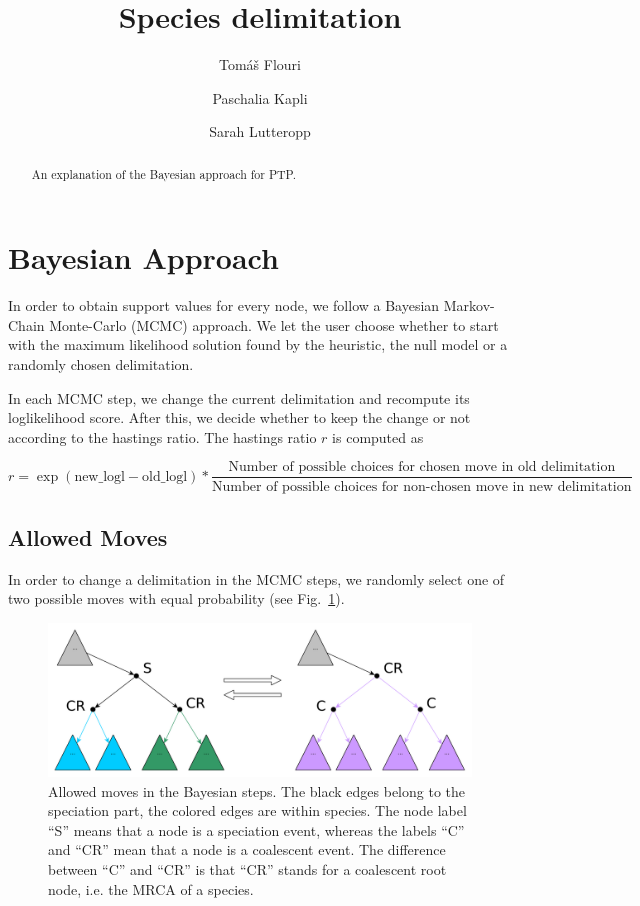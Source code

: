 \documentclass{llncs}
\begin{document}
\title{Species delimitation}


\author{Tom\'{a}\v{s} Flouri \and Paschalia Kapli \and Sarah Lutteropp}

\maketitle

\begin{abstract}
An explanation of the Bayesian approach for PTP.\@
\end{abstract}

\section{Bayesian Approach}

In order to obtain support values for every node, we follow a Bayesian Markov-Chain Monte-Carlo (MCMC) approach. We let the user choose whether to start with the maximum likelihood solution found by the heuristic, the null model or a randomly chosen delimitation.

In each MCMC step, we change the current delimitation and recompute its loglikelihood score. After this, we decide whether to keep the change or not according to the hastings ratio. The hastings ratio $r$ is computed as

$$r = \exp(\text{new\_logl} - \text{old\_logl}) * \frac{\text{Number of possible choices for chosen move in old delimitation}}{\text{Number of possible choices for non-chosen move in new delimitation}}$$

\subsection{Allowed Moves}

In order to change a delimitation in the MCMC steps, we randomly select one of two possible moves with equal probability (see Fig.~\ref{fig:moves}).

\begin{figure}[h!]
\centering
\includegraphics[scale=0.3]{images/moves.pdf}
\caption{Allowed moves in the Bayesian steps. The black edges belong to the speciation part, the colored edges are within species. The node label ``S'' means that a node is a speciation event, whereas the labels ``C'' and ``CR'' mean that a node is a coalescent event. The difference between ``C'' and ``CR'' is that ``CR'' stands for a coalescent root node, i.e. the MRCA of a species.}
\label{fig:moves}
\end{figure}
\end{document}
